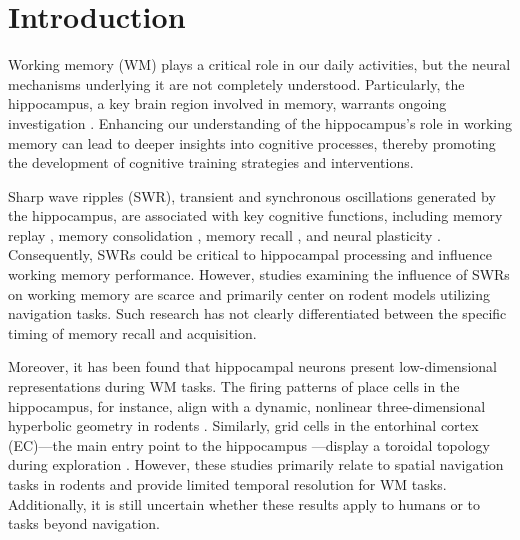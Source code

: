 \documentclass[final,3p,times,twocolumn]{elsarticle}
\begin{document}
\section{Introduction}
Working memory (WM) plays a critical role in our daily activities, but the neural mechanisms underlying it are not completely understood. Particularly, the hippocampus, a key brain region involved in memory, warrants ongoing investigation \cite{scoville_loss_1957,squire_legacy_2009,boran_persistent_2019,kaminski_persistently_2017,kornblith_persistent_2017,faraut_dataset_2018,borders_hippocampus_2022,li_functional_2023,dimakopoulos_information_2022}. Enhancing our understanding of the hippocampus's role in working memory can lead to deeper insights into cognitive processes, thereby promoting the development of cognitive training strategies and interventions. 

\indent
Sharp wave ripples (SWR), transient and synchronous oscillations generated by the hippocampus, are associated with key cognitive functions, including memory replay \cite{wilson_reactivation_1994,nadasdy_replay_1999,lee_memory_2002,davidson_hippocampal_2009}, memory consolidation \cite{girardeau_selective_2009,ego-stengel_disruption_2010,fernandez-ruiz_long-duration_2019,kim_corticalhippocampal_2022}, memory recall \cite{wu_hippocampal_2017,norman_hippocampal_2019,norman_hippocampal_2021}, and neural plasticity \cite{behrens_induction_2005,norimoto_hippocampal_2018}. Consequently, SWRs could be critical to hippocampal processing and influence working memory performance. However, studies examining the influence of SWRs on working memory are scarce \cite{jadhav_awake_2012} and primarily center on rodent models utilizing navigation tasks. Such research has not clearly differentiated between the specific timing of memory recall and acquisition.

\indent
Moreover, it has been found that hippocampal neurons present low-dimensional representations during WM tasks. The firing patterns of place cells \cite{okeefe_hippocampus_1971,okeefe_place_1976,ekstrom_cellular_2003,kjelstrup_finite_2008,harvey_intracellular_2009,royer_control_2012} in the hippocampus, for instance, align with a dynamic, nonlinear three-dimensional hyperbolic geometry in rodents \cite{zhang_hippocampal_2022}. Similarly, grid cells in the entorhinal cortex (EC)—the main entry point to the hippocampus \cite{naber_reciprocal_2001,van_strien_anatomy_2009,strange_functional_2014}—display a toroidal topology during exploration \cite{gardner_toroidal_2022}. However, these studies primarily relate to spatial navigation tasks in rodents and provide limited temporal resolution for WM tasks. Additionally, it is still uncertain whether these results apply to humans or to tasks beyond navigation.
\end{document}
